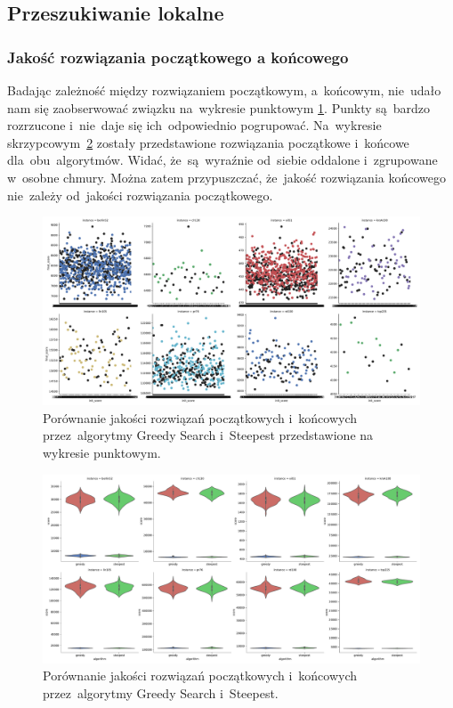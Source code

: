 \subsection{Przeszukiwanie lokalne}

\subsubsection{Jakość rozwiązania początkowego a końcowego}

Badając zależność między rozwiązaniem początkowym, a~końcowym, nie~udało nam się zaobserwować związku na~wykresie punktowym \ref{fig:diff_point}. Punkty są~bardzo rozrzucone i~nie~daje się ich~odpowiednio pogrupować. Na~wykresie skrzypcowym~\ref{fig:diff} zostały przedstawione rozwiązania początkowe i~końcowe dla~obu~algorytmów. Widać, że~są~wyraźnie od~siebie oddalone i~zgrupowane w~osobne chmury. Można zatem przypuszczać, że~jakość rozwiązania końcowego nie~zależy od~jakości rozwiązania początkowego.

\begin{figure}
\begin{center}
\includegraphics[width=1.0\textwidth]{graphs/init_vs_final_score_point.pdf}
\end{center}
\caption{Porównanie jakości rozwiązań początkowych i~końcowych przez~algorytmy Greedy Search i~Steepest przedstawione na wykresie punktowym.}
\label{fig:diff_point}
\end{figure}

\begin{figure}
\begin{center}
\includegraphics[width=1.0\textwidth]{graphs/init_vs_final_score_violin.pdf}
\end{center}
\caption{Porównanie jakości rozwiązań początkowych i~końcowych przez~algorytmy Greedy Search i~Steepest.}
\label{fig:diff}
\end{figure}

